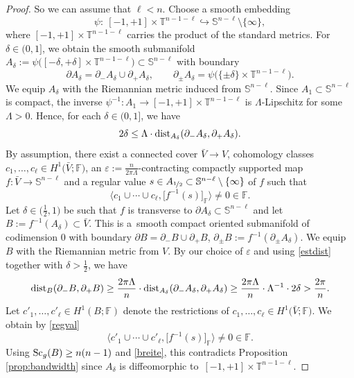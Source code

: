 \documentclass[10pt,a4paper]{amsart}
\numberwithin{equation}{section}
\newcommand{\F}{\mathbb{F}}
\newcommand{\SSS}{\mathbb{S}}
\newcommand{\TTT}{\mathbb{T}}
\newcommand{\eps}{\varepsilon}
\newcommand{\Sc}{{\rm Sc}}
\begin{document}
\begin{proof}
So we can assume that $\ell < n$.
Choose a smooth embedding
\[
 \psi \colon\ [-1,+1] \times \TTT^{n-1-\ell} \hookrightarrow \SSS^{n-\ell} \setminus \{\infty \},
\]
where $[-1,+1] \times \TTT^{n-1-\ell}$ carries the product of the standard metrics.
For $\delta \in (0,1]$, we obtain the smooth submanifold $A_\delta := \psi\big( [ - \delta , + \delta] \times \TTT^{n-1-\ell} \big) \subset \SSS^{n-\ell}$ with boundary
\[
 \partial A_\delta = \partial_- A_\delta \cup \partial_+ A_\delta , \qquad \partial_{\pm} A_\delta = \psi\big(\{ \pm \delta\} \times \TTT^{n-1-\ell}\big) .
\]
We equip $A_\delta$ with the Riemannian metric induced from $\SSS^{n-\ell}$.
Since $A_1 \subset \SSS^{n-\ell}$ is compact, the inverse $\psi^{-1} \colon A_1 \to [-1,+1] \times \TTT^{n-1-\ell}$ is $\Lambda$-Lipschitz for some $\Lambda > 0$.
Hence, for each $\delta \in (0,1]$, we have
\begin{equation} \label{estdist}
 2 \delta \leq \Lambda \cdot {\rm dist}_{A_\delta} ( \partial_- A_\delta, \partial_+ A_\delta) .
\end{equation}
By assumption, there exist a connected cover $\bar V \to V$, cohomology classes $c_1, \ldots , c_{\ell} \in H^1\big( \bar V; \F\big)$, an $\eps := \tfrac{n}{2 \pi \Lambda}$-contracting compactly supported map $f \colon \bar V \to \SSS^{n-\ell}$ and a regular value $s \in A_{\nicefrac{1}{2}} \subset \SSS^{n-\ell} \setminus \{ \infty\}$ of $f$ such that
\begin{equation} \label{regval}
 \big\langle c_1 \cup \cdots \cup c_{\ell}, \big[ f^{-1}(s) \big]_\F \big\rangle \neq 0 \in \F .
\end{equation}
Let $\delta \in \big(\tfrac{1}{2} ,1\big)$ be such that $f$ is transverse to $\partial A_\delta \subset \SSS^{n-\ell}$ and let
$
 B := f^{-1} ( A_\delta) \subset \bar V $.
This is a~smooth compact oriented submanifold of codimension $0$ with boundary
$
 \partial B = \partial_- B \cup \partial_+ B$, $ \partial_{\pm} B := f^{-1} (\partial_{\pm} A_\delta) $.
We equip $B$ with the Riemannian metric from $V$.
By our choice of $\varepsilon$ and using \eqref{estdist} together with $\delta > \tfrac{1}{2}$, we have
\begin{equation} \label{breite}
 {\rm dist}_B( \partial_- B, \partial_+ B) \geq \frac{2 \pi \Lambda}{n} \cdot {\rm dist}_{A_\delta} (\partial_- A_\delta, \partial_+ A_\delta)
 \geq \frac{2 \pi \Lambda}{n} \cdot \Lambda^{-1} \cdot 2\delta > \frac{2\pi}{n} .
\end{equation}
Let $c'_1, \ldots , c'_\ell \in H^1(B; \F)$ denote the restrictions of $c_1, \ldots , c_\ell \in H^1\big(\bar V; \F\big)$.
We obtain by \eqref{regval}
\[
 \big\langle c'_1 \cup \cdots \cup c'_{\ell}, \big[ f^{-1}(s) \big]_{\F} \big\rangle \neq 0 \in \F.
\]
Using $\Sc_g(B) \geq n(n-1)$ and \eqref{breite}, this contradicts Proposition \ref{prop:bandwidth} since $A_{\delta}$ is diffeomorphic to~${[-1, +1] \times \TTT^{n-1-\ell}}$.
\end{proof}
\end{document}
